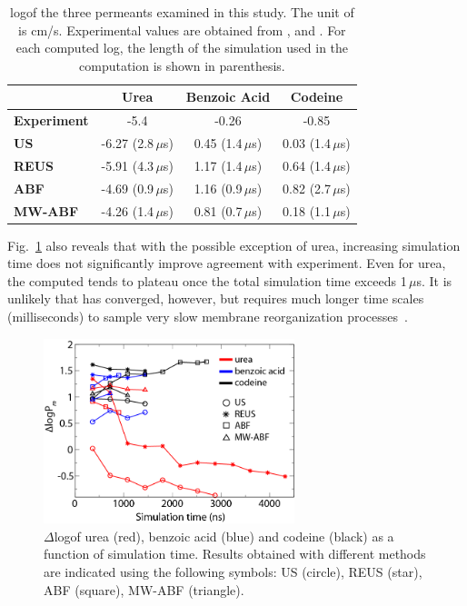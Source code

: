 
\begin{table}[h]
\centering
\caption[Estimated permeability values of permeants for each enhanced sampling strategy]{log\perm of the three permeants examined in this study. The unit of \perm is cm/s. Experimental values are obtained from ,  and .
For each computed log\perm, the length of the simulation used in the computation is shown in parenthesis.}
\begin{tabular}{@{}lccc@{}}
\toprule
& Urea & Benzoic Acid & Codeine     \\ \midrule
\textbf{Experiment} & -5.4          & -0.26                                             & -0.85      \\
\textbf{US}                & -6.27 (2.8\,$\mu$s)   & 0.45 (1.4\,$\mu$s)             & 0.03 (1.4\,$\mu$s)   \\
\textbf{REUS}              &  -5.91 (4.3\,$\mu$s)   & 1.17 (1.4\,$\mu$s)   & 0.64 (1.4\,$\mu$s)   \\
\textbf{ABF}               & -4.69 (0.9\,$\mu$s) & 1.16 (0.9\,$\mu$s)      &  0.82 (2.7\,$\mu$s)   \\
\textbf{MW-ABF}    &  -4.26 (1.4\,$\mu$s)   & 0.81 (0.7\,$\mu$s)       & 0.18 (1.1\,$\mu$s) \\ \bottomrule
\end{tabular}
\label{table:permresults}
\end{table}

Fig.~\ref{fig:deltaP} also reveals that with the possible exception of urea, increasing simulation time does not significantly improve agreement with experiment.  Even for urea, the computed \perm tends to plateau once the total simulation time exceeds 1\,$\mu$s.  It is unlikely that \perm has converged, however, but requires much longer time scales (milliseconds) to sample very slow membrane reorganization processes~\cite{Neale2011}.



\begin{figure}
\centering
\includegraphics[width=0.65\textwidth]{Figures/dlogP-recolor.png}
\caption[Comparison of estimated permeability from four enhanced sampling methods]{$\Delta$log\perm of urea (red), benzoic acid (blue) and codeine (black) as a function of simulation time. Results obtained with different methods are indicated using the following symbols: US (circle), REUS (star), ABF (square), MW-ABF (triangle). }
\label{fig:deltaP}
\end{figure}


